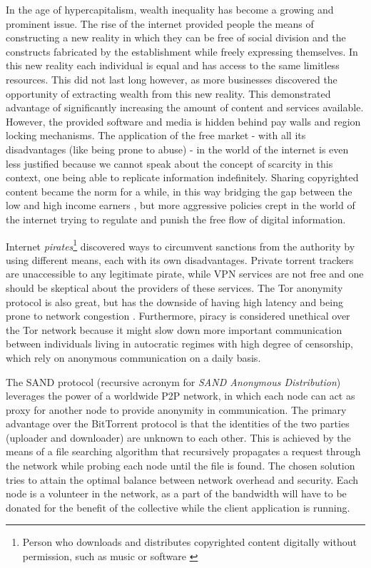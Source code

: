 In the age of hypercapitalism, wealth inequality has become a growing and 
prominent issue. The rise of the internet provided people the means of 
constructing a new reality in which they can be free of social division and the 
constructs fabricated by the establishment while freely expressing themselves. 
In this new reality each individual is equal and has access to the same 
limitless resources. This did not last long however, as more businesses 
discovered the opportunity of extracting wealth from this new reality. This 
demonstrated advantage of significantly increasing the amount of content and 
services available. However, the provided software and media is hidden behind 
pay walls and region locking mechanisms. The application of the free market - 
with all its disadvantages (like being prone to abuse) - in the world of the 
internet is even less justified because we cannot speak about the concept of 
scarcity in this context, one being able to replicate information indefinitely. 
Sharing copyrighted content became the norm for a while, in this way bridging 
the gap between the low and high income earners \cite{piracyinequality}, but 
more aggressive policies crept in the world of the internet trying to regulate 
and punish the free flow of digital information.

Internet \textit{pirates}\footnote{Person who downloads and distributes 
copyrighted content digitally without permission, such as music or software 
\cite{CHOI2007168}} discovered ways to circumvent sanctions from the authority 
by using different means, each with its own disadvantages. Private torrent 
trackers are unaccessible to any legitimate pirate, while VPN services are not 
free and one should be skeptical about the providers of these services. The Tor 
anonymity protocol is also great, but has the downside of having high latency 
and being prone to network congestion \cite{torcongestion}. Furthermore, piracy 
is considered unethical over the Tor network because it might slow down more 
important communication between individuals living in autocratic regimes with 
high degree of censorship, which rely on anonymous communication on a daily 
basis.

The SAND protocol (recursive acronym for \textit{SAND Anonymous Distribution}) 
leverages the power of a worldwide P2P network, in which each node can act as 
proxy for another node to provide anonymity in communication. The primary 
advantage over the BitTorrent protocol is that the identities of the two 
parties (uploader and downloader) are unknown to each other. This is achieved 
by the means of a file searching algorithm that recursively propagates a 
request through the network while probing each node until the file is found. 
The chosen solution tries to attain the optimal balance between network 
overhead and security. Each node is a volunteer in the network, as a part of 
the bandwidth will have to be donated for the benefit of the collective while 
the client application is running.
